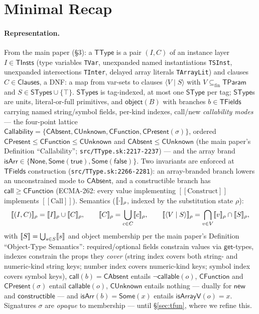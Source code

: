 \documentclass[11pt]{article}
\newcommand{\SType}{\mathsf{SType}}
\newcommand{\STypes}{\mathsf{STypes}}
\newcommand{\TType}{\mathsf{TType}}
\newcommand{\Clauses}{\mathsf{Clauses}}
\newcommand{\TInsts}{\mathsf{TInsts}}
\newcommand{\TParam}{\mathsf{TParam}}
\newcommand{\TFields}{\mathsf{TFields}}
\newcommand{\clause}[2]{\langle #1 \mid #2 \rangle}
\begin{document}
\section{Minimal Recap}
\label{sec:recap}

\paragraph{Representation.}
From the main paper (\S3): a $\TType$ is a pair $(I, C)$ of an instance
layer $I \in \TInsts$ (type variables \texttt{TVar}, unexpanded named
instantiations \texttt{TSInst}, unexpanded intersections \texttt{TInter},
delayed array literals \texttt{TArrayLit}) and clauses $C \in \Clauses$, a
DNF: a map from var-sets to clauses $\clause{V}{S}$ with
$V \subseteq_{\mathrm{fin}} \TParam$ and $S \in \STypes \cup \{\top\}$.
$\STypes$ is tag-indexed, at most one $\SType$ per tag; $\SType$s are
units, literal-or-full primitives, and $\mathsf{object}(B)$ with branches
$b \in \TFields$ carrying named string/symbol fields, per-kind indexes,
call/new \emph{callability modes} --- the four-point lattice
$\mathsf{Callability} =
\{\mathsf{CAbsent}, \mathsf{CUnknown}, \mathsf{CFunction},
\mathsf{CPresent}(\sigma)\}$, ordered
$\mathsf{CPresent} \leq \mathsf{CFunction} \leq \mathsf{CUnknown}$ and
$\mathsf{CAbsent} \leq \mathsf{CUnknown}$
(the main paper's Definition ``Callability'';
\texttt{src/TType.sk:2217-2237}) --- and the array brand
$\mathsf{isArr} \in \{\mathsf{None},\mathsf{Some}(\mathsf{true}),
\mathsf{Some}(\mathsf{false})\}$. Two invariants are enforced at
$\TFields$ construction (\texttt{src/TType.sk:2266-2281}): an
array-branded branch lowers an unconstrained mode to $\mathsf{CAbsent}$,
and a constructible branch has $\mathsf{call} \geq \mathsf{CFunction}$
(ECMA-262: every value implementing $[[\mathrm{Construct}]]$ implements
$[[\mathrm{Call}]]$).
Semantics ($\llbracket \cdot \rrbracket_\rho$, indexed by the substitution state $\rho$):
\[
\sem{(I,C)}_\rho = \sem{I}_\rho \cup \sem{C}_\rho, \qquad
\sem{C}_\rho = \bigcup_{c \in C}\sem{c}_\rho, \qquad
\sem{\clause{V}{S}}_\rho = \bigcap_{v \in V}\sem{v}_\rho \cap \sem{S}_\rho,
\]
with $\llbracket S \rrbracket = \bigcup_{s\in S}\llbracket s \rrbracket$ and object membership per the
main paper's Definition ``Object-Type Semantics'': required/optional
fields constrain values via $\mathsf{get}$-types, indexes constrain the
props they \emph{cover} (string index covers both string- and numeric-kind
string keys; number index covers numeric-kind keys; symbol index covers
symbol keys), $\mathsf{call}(b)=\mathsf{CAbsent}$ entails
$\neg\mathsf{callable}(o)$, $\mathsf{CFunction}$ and
$\mathsf{CPresent}(\sigma)$ entail $\mathsf{callable}(o)$,
$\mathsf{CUnknown}$ entails nothing --- dually for $\mathsf{new}$ and
$\mathsf{constructible}$ --- and
$\mathsf{isArr}(b)=\mathsf{Some}(x)$ entails $\mathsf{isArrayV}(o)=x$.
Signatures $\sigma$ are \emph{opaque} to membership --- until
\S\ref{sec:tfun}, where we refine this.
\end{document}
